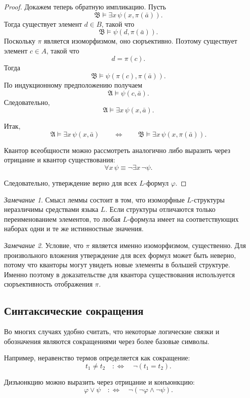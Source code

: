 \documentclass[12pt,a4paper,oneside,openany]{book}
\theoremstyle{definition}
\theoremstyle{plain}
\theoremstyle{remark}
\newtheorem{remark}{Замечание}[chapter]
\begin{document}
\begin{proof}
Докажем теперь обратную импликацию. Пусть
\[
\mathfrak B\models \exists x\,\psi(x,\pi(\bar a)).
\]
Тогда существует элемент $d\in B$, такой что
\[
\mathfrak B\models \psi(d,\pi(\bar a)).
\]
Поскольку $\pi$ является изоморфизмом, оно сюръективно. Поэтому существует элемент $c\in A$, такой что
\[
d=\pi(c).
\]
Тогда
\[
\mathfrak B\models \psi(\pi(c),\pi(\bar a)).
\]
По индукционному предположению получаем
\[
\mathfrak A\models \psi(c,\bar a).
\]
Следовательно,
\[
\mathfrak A\models \exists x\,\psi(x,\bar a).
\]

Итак,
\[
\mathfrak A\models \exists x\,\psi(x,\bar a)
\qquad
\Longleftrightarrow
\qquad
\mathfrak B\models \exists x\,\psi(x,\pi(\bar a)).
\]

Квантор всеобщности можно рассмотреть аналогично либо выразить через отрицание и квантор существования:
\[
\forall x\,\psi \equiv \neg\exists x\,\neg\psi.
\]

Следовательно, утверждение верно для всех $L$-формул $\varphi$.
\end{proof}

\begin{remark}
Смысл леммы состоит в том, что изоморфные $L$-структуры неразличимы средствами языка $L$.
Если структуры отличаются только переименованием элементов, то любая $L$-формула имеет на соответствующих наборах одни и те же истинностные значения.
\end{remark}

\begin{remark}
Условие, что $\pi$ является именно изоморфизмом, существенно.
Для произвольного вложения утверждение для всех формул может быть неверно, потому что кванторы могут увидеть новые элементы в большей структуре.
Именно поэтому в доказательстве для квантора существования используется сюръективность отображения $\pi$.
\end{remark}

\subsection{ Синтаксические сокращения}

Во многих случаях удобно считать, что некоторые логические связки и обозначения являются сокращениями через более базовые символы.

Например, неравенство термов определяется как сокращение:
\[
t_1\ne t_2
\quad:\Longleftrightarrow\quad
\neg(t_1=t_2).
\]

Дизъюнкцию можно выразить через отрицание и конъюнкцию:
\[
\varphi\vee\psi
\quad:\Longleftrightarrow\quad
\neg(\neg\varphi\wedge\neg\psi).
\]
\end{document}
